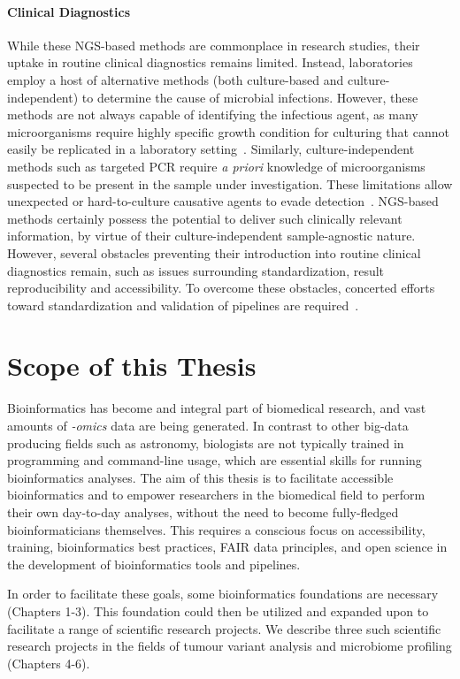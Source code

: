 \begin{justify}
\paragraph{Clinical Diagnostics}
While these NGS-based methods are commonplace in research studies, their uptake in routine clinical diagnostics remains limited. Instead, laboratories employ a host of alternative methods (both culture-based and culture-independent) to determine the cause of microbial infections. However, these methods are not always capable of identifying the infectious agent, as many microorganisms require highly specific growth condition for culturing that cannot easily be replicated in a laboratory setting~\cite{lagier2015rebirth}. Similarly, culture-independent methods such as targeted PCR require \emph{a priori} knowledge of microorganisms suspected to be present in the sample under investigation. These limitations allow unexpected or hard-to-culture causative agents to evade detection~\cite{yang2004pcr}. NGS-based methods certainly possess the potential to deliver such clinically relevant information, by virtue of their culture-independent sample-agnostic nature. However, several obstacles preventing their introduction into routine clinical diagnostics remain, such as issues surrounding standardization, result reproducibility and accessibility. To overcome these obstacles, concerted efforts toward standardization and validation of pipelines are required~\cite{caliendo2013better}.

\section{Scope of this Thesis}

Bioinformatics has become and integral part of biomedical research, and vast amounts of \emph{-omics} data are being generated. In contrast to other big-data producing fields such as astronomy, biologists are not typically trained in programming and command-line usage, which are essential skills for running bioinformatics analyses. The aim of this thesis is to facilitate accessible bioinformatics and to empower researchers in the biomedical field to perform their own day-to-day analyses, without the need to become fully-fledged bioinformaticians themselves. This requires a conscious focus on accessibility, training, bioinformatics best practices, FAIR data principles, and open science in the development of bioinformatics tools and pipelines.

In order to facilitate these goals, some bioinformatics foundations are necessary (Chapters 1-3). This foundation could then be utilized and expanded upon to facilitate a range of scientific research projects. We describe three such scientific research projects in the fields of tumour variant analysis and microbiome profiling (Chapters 4-6).


\end{justify}
